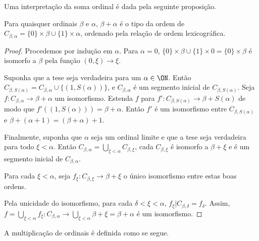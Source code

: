 Uma interpretação da soma ordinal é dada pela seguinte proposição.

\begin{proposition}\label{prop:tipoLexicograficoDaSomaOrdinal}
    Para quaisquer ordinais $\beta$ e $\alpha$, $\beta+\alpha$ é o tipo da ordem de $C_{\beta, \alpha}=\{0\}\times \beta\cup\{1\}\times \alpha$, ordenado pela relação de ordem lexicográfica.
\end{proposition}
\begin{proof}
    Procedemos por indução em $\alpha$.
    Para $\alpha=0$, $\{0\}\times \beta\cup\{1\}\times 0=\{0\}\times \beta$ é isomorfo a $\beta$ pela função $(0, \xi)\to \xi$.

    Suponha que a tese seja verdadeira para um $\alpha\in \ON$.
    Então $C_{\beta, S(\alpha)}=C_{\beta, \alpha}\cup\{(1, S(\alpha))\}$, e $C_{\beta, \alpha}$ é um segmento inicial de $C_{\beta, S(\alpha)}$.
    Seja $f: C_{\beta, \alpha}\to \beta+\alpha$ um isomorfismo.
    Estenda $f$ para $f': C_{\beta, S(\alpha)}\to \beta+S(\alpha)$ de modo que $f'((1, S(\alpha)))=\beta+\alpha$.
    Então $f'$ é um isomorfismo entre $C_{\beta, S(\alpha)}$ e $\beta+(\alpha+1)=(\beta+\alpha)+1$.

    Finalmente, suponha que $\alpha$ seja um ordinal limite e que a tese seja verdadeira para todo $\xi<\alpha$.
    Então $C_{\beta, \alpha}=\bigcup_{\xi<\alpha} C_{\beta, \xi}$, cada $C_{\beta, \xi}$ é isomorfo a $\beta+\xi$ e é um segmento inicial de $C_{\beta, \alpha}$.

    Para cada $\xi<\alpha$, seja $f_\xi: C_{\beta, \xi}\to \beta+\xi$ o único isomorfismo entre estas boas ordens.
    
    Pela unicidade do isomorfismo, para cada $\delta<\xi<\alpha$, $f_\xi|C_{\beta, \delta}=f_\delta$.
    Assim, $f=\bigcup_{\xi<\alpha} f_\xi: C_{\beta, \alpha}\to \bigcup_{\xi<\alpha} \beta+\xi=\beta+\alpha$ é um isomorfismo.
\end{proof}

A multiplicação de ordinais é definida como se segue.

